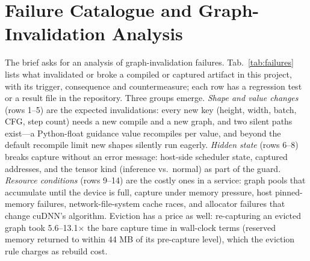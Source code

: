 \documentclass[conference]{IEEEtran}
\newcommand{\tn}[1]{#1}%
\begin{document}
\section{Failure Catalogue and Graph-Invalidation Analysis}\label{sec:failures}
The brief asks for an analysis of graph-invalidation failures. Tab.~\ref{tab:failures} lists what invalidated or broke a compiled or captured artifact in this project, with its trigger, consequence and countermeasure; each row has a regression test or a result file in the repository. Three groups emerge. \emph{Shape and value changes} (rows 1--5) are the expected invalidations: every new key (height, width, batch, CFG, step count) needs a new compile and a new graph, and two silent paths exist---a Python-float guidance value recompiles per value, and beyond the default recompile limit new shapes silently run eagerly. \emph{Hidden state} (rows 6--8) breaks capture without an error message: host-side scheduler state, captured addresses, and the tensor kind (inference vs.\ normal) as part of the guard. \emph{Resource conditions} (rows 9--14) are the costly ones in a service: graph pools that accumulate until the device is full, capture under memory pressure, host pinned-memory failures, network-file-system cache races, and allocator failures that change cuDNN's algorithm. Eviction has a price as well: re-capturing an evicted graph took \tn{5.6--13.1}$\times$ the bare capture time in wall-clock terms (reserved memory returned to within \tn{44 MB} of its pre-capture level), which the eviction rule charges as rebuild cost.
\end{document}
